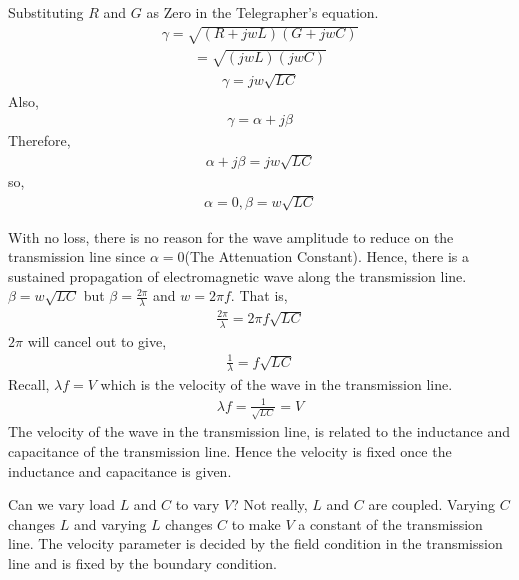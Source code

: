 Substituting $R$ and $G$ as Zero in the Telegrapher's equation.
\begin{align*}
\gamma = \sqrt{(R + jwL)(G + jwC)}
\end{align*}
\begin{align*}
= \sqrt{(jwL)(jwC)}
\end{align*}
\begin{align*}
\gamma = jw \sqrt{LC}
\end{align*}
Also,
\begin{align*}
\gamma = \alpha + j\beta
\end{align*} 
Therefore,
\begin{align*}
\alpha + j\beta = jw\sqrt{LC}
\end{align*}
so,
\begin{align*}
\alpha = 0, \beta = w\sqrt{LC}
\end{align*}

With no loss, there is no reason for the wave amplitude to reduce on the transmission line since $\alpha = 0$(The Attenuation Constant). Hence, there is a sustained propagation of electromagnetic wave along the transmission line.\\
$\beta = w\sqrt{LC}$ but $\beta = \frac{2\pi}{\lambda}$ and $w = 2\pi f $. That is,
\begin{align*}
\frac{2\pi}{\lambda} = 2\pi f\sqrt{LC}
\end{align*}
$2\pi$ will cancel out to give,
\begin{align*}
\frac{1}{\lambda} =  f\sqrt{LC}
\end{align*}
Recall, $\lambda f = V$ which is the velocity of the wave in the transmission line.
\begin{align*}
\lambda f = \frac{1}{\sqrt{LC}} = V
\end{align*}
The velocity of the wave in the transmission line, is related to the inductance and capacitance of the transmission line. Hence the velocity is fixed once the inductance and capacitance is given.

Can we vary load $L$ and $C$ to vary $V$? Not really, $L$ and $C$ are coupled. Varying $C$ changes $L$ and varying $L$ changes $C$ to make $V$ a constant of the transmission line. The velocity parameter is decided by the field condition in the transmission line and is fixed by the boundary condition. 

